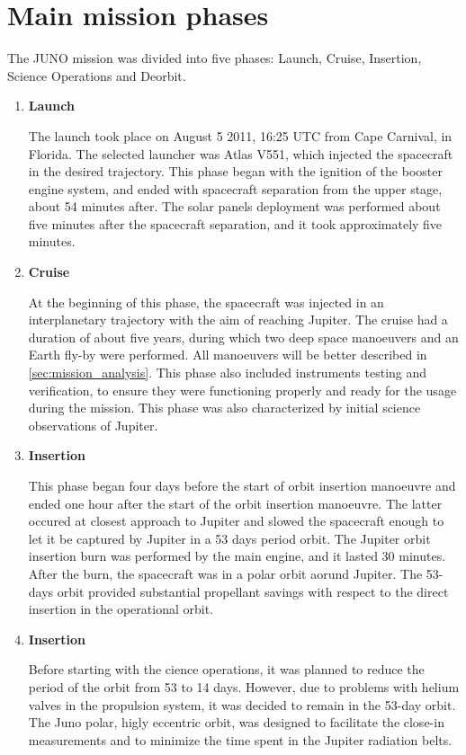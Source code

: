 \section{Main mission phases}
\label{sec:phases}

The JUNO mission was divided into five phases: Launch, Cruise, Insertion, Science Operations and Deorbit.
\begin{enumerate}
    \item \textbf{Launch} 
    

    The launch took place on August 5 2011, 16:25 UTC from Cape Carnival, in Florida. The selected launcher was Atlas V551, which injected the spacecraft in the desired trajectory.
    This phase began with the ignition of the booster engine system, and ended with spacecraft separation from the upper stage, about 54 minutes after. The solar panels deployment was performed about five minutes after the spacecraft separation, and it took approximately five minutes.

    \item \textbf{Cruise}
    
    At the beginning of this phase, the spacecraft was injected in an interplanetary trajectory with the aim of reaching Jupiter. The cruise had a duration of about five years, during which two deep space manoeuvers and an Earth fly-by were performed.
    All manoeuvers will be better described in \autoref{sec:mission_analysis}. This phase also included instruments testing and verification, to ensure they were functioning properly and ready for the usage during the mission. This phase was also characterized by initial science observations of Jupiter.

    \item \textbf{Insertion}
    
    This phase began four days before the start of orbit insertion manoeuvre and ended one hour after the start of the orbit insertion manoeuvre. The latter occured at closest approach to Jupiter and slowed the spacecraft enough to let it be captured by Jupiter in a 53 days period orbit.
    The Jupiter orbit insertion burn was performed by the main engine, and it lasted 30 minutes. After the burn, the spacecraft was in a polar orbit aorund Jupiter.
    The 53-days orbit provided substantial propellant savings with respect to the direct insertion in the operational orbit.

    \item \textbf{Insertion}
    
    Before starting with the cience operations, it was planned to reduce the period of the orbit from 53 to 14 days.
    However, due to problems with helium valves in the propulsion system, it was decided to remain in the 53-day orbit. The Juno polar, higly eccentric orbit, was designed to facilitate the close-in measurements and to minimize the time spent in the Jupiter radiation belts.


\end{enumerate}
